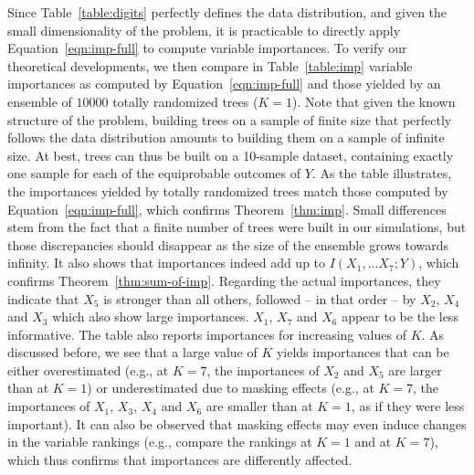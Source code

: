\documentclass{article}
\begin{document}
Since Table~\ref{table:digits} perfectly defines the data distribution, and
given the small dimensionality of the problem, it is practicable to directly
apply Equation~\ref{eqn:imp-full} to compute variable importances. To verify our
theoretical developments, we then compare in Table~\ref{table:imp} variable
importances as computed by Equation~\ref{eqn:imp-full} and those yielded by an
ensemble of $10000$ totally randomized trees ($K=1$). Note that given the  known
structure of the problem, building trees on a sample of finite size  that
perfectly follows the data distribution amounts to building them on a sample of
infinite size. At best, trees can thus be built on a 10-sample dataset,
containing exactly one sample for each of the equiprobable outcomes of $Y$. As
the table illustrates, the importances yielded by totally randomized trees match
those computed by Equation~\ref{eqn:imp-full}, which confirms
Theorem~\ref{thm:imp}. Small differences stem from the fact that a finite number
of  trees were built in our simulations, but those discrepancies should
disappear as the size of the ensemble grows towards infinity. It also shows that
importances indeed add up to $I(X_1, ... X_7;Y)$, which confirms
Theorem~\ref{thm:sum-of-imp}.
Regarding the actual importances, they indicate that $X_5$ is stronger than all
others, followed -- in that order -- by $X_2$, $X_4$ and $X_3$ which also show
large importances. $X_1$, $X_7$ and $X_6$ appear to be the less informative. The
table also reports importances for increasing values of $K$. As discussed before,
we see that a large value of $K$ yields importances that can be either
overestimated (e.g., at $K=7$, the importances of $X_2$ and $X_5$ are larger
than at $K=1$) or underestimated due to masking effects (e.g., at $K=7$, the
importances of $X_1$, $X_3$, $X_4$ and $X_6$ are smaller than at $K=1$, as if
they were less important). It can also be observed that masking effects may even
induce changes in the variable rankings (e.g., compare the rankings at $K=1$ and
at $K=7$), which thus confirms that importances are differently affected.
\end{document}
